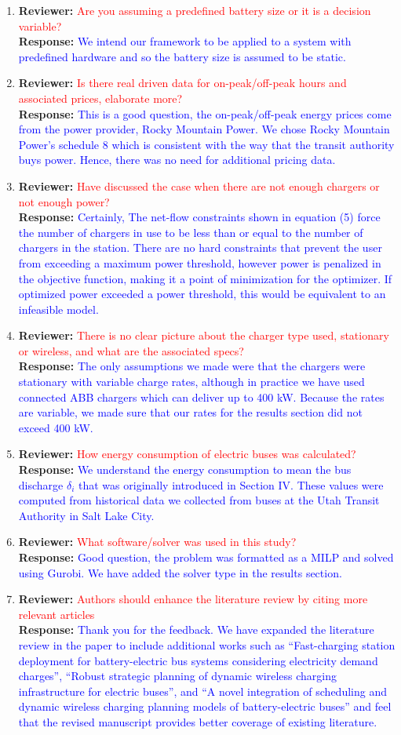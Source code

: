 \documentclass{article}
\newcommand\formatfeedback[2]
{%
	\textbf{Reviewer:} \textcolor{red}{#1} 
	\\[0.1in] \textbf{Response:} \textcolor{blue}{#2}
}
\begin{document}
\begin{enumerate}
	\item \formatfeedback{Are you assuming a predefined battery size or it is a decision variable?}%
			     {We intend our framework to be applied to a system with predefined hardware and so the battery size is assumed to be static.} 
	\item \formatfeedback{Is there real driven data for on-peak/off-peak hours and associated prices, elaborate more?}%
			     {This is a good question, the on-peak/off-peak energy prices come from the power provider, Rocky Mountain Power.  We chose Rocky Mountain Power's schedule 8 which is consistent with the way that the transit authority buys power. Hence, there was no need for additional pricing data.} 
	\item \formatfeedback{Have discussed the case when there are not enough chargers or not enough power?}%
		{Certainly, The net-flow constraints shown in equation (5) force the number of chargers in use to be less than or equal to the number of chargers in the station. There are no hard constraints that prevent the user from exceeding a maximum power threshold, however power is penalized in the objective function, making it a point of minimization for the optimizer. If optimized power exceeded a power threshold, this would be equivalent to an infeasible model.} 
	\item \formatfeedback{There is no clear picture about the charger type used, stationary or wireless, and what are the associated specs?}%
			     {The only assumptions we made were that the chargers were stationary with variable charge rates, although in practice we have used connected ABB chargers which can deliver up to 400 kW. Because the rates are variable, we made sure that our rates for the results section did not exceed 400 kW.} 
	\item \formatfeedback{How energy consumption of electric buses was calculated?}%
			     {We understand the energy consumption to mean the bus discharge $\delta_i$ that was originally introduced in Section IV.  These values were computed from historical data we collected from buses at the Utah Transit Authority in Salt Lake City.} 
	\item \formatfeedback{What software/solver was used in this study?}%
			     {Good question, the problem was formatted as a MILP and solved using Gurobi.  We have added the solver type in the results section.} 
	\item \formatfeedback{Authors should enhance the literature review by citing more relevant articles}%
			     {Thank you for the feedback. We have expanded the literature review in the paper to include additional works such as ``Fast-charging station deployment for battery-electric bus systems considering electricity demand charges'', ``Robust strategic planning of dynamic wireless charging infrastructure for electric buses'', and ``A novel integration of scheduling and dynamic wireless charging planning models of battery-electric buses'' and feel that the revised manuscript provides better coverage of existing literature.} 

\end{enumerate}
\end{document}
